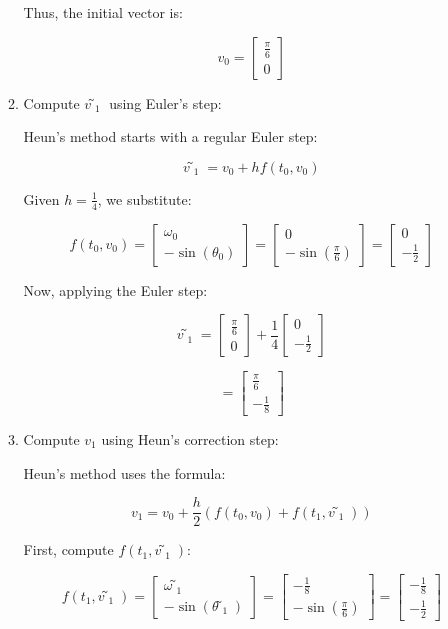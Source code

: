 \documentclass[12pt]{article}
\begin{document}
\begin{enumerate}
\begin{enumerate}
    Thus, the initial vector is:

    \[
    v_0 =
    \begin{bmatrix}
    \frac{\pi}{6} \\
    0
    \end{bmatrix}
    \]

    \item Compute \( ṽ_1 \) using Euler's step:

    Heun’s method starts with a regular Euler step:

    \[
    ṽ_1 = v_0 + h f(t_0, v_0)
    \]

    Given \( h = \frac{1}{4} \), we substitute:

    \[
    f(t_0, v_0) =
    \begin{bmatrix}
    \omega_0 \\
    -\sin(\theta_0)
    \end{bmatrix}
    =
    \begin{bmatrix}
    0 \\
    -\sin\left(\frac{\pi}{6}\right)
    \end{bmatrix}
    =
    \begin{bmatrix}
    0 \\
    -\frac{1}{2}
    \end{bmatrix}
    \]

    Now, applying the Euler step:

    \[
    ṽ_1 = 
    \begin{bmatrix}
    \frac{\pi}{6} \\
    0
    \end{bmatrix}
    + \frac{1}{4}
    \begin{bmatrix}
    0 \\
    -\frac{1}{2}
    \end{bmatrix}
    \]

    \[
    =
    \begin{bmatrix}
    \frac{\pi}{6} \\
    -\frac{1}{8}
    \end{bmatrix}
    \]

    \item Compute \( v_1 \) using Heun’s correction step:

    Heun’s method uses the formula:

    \[
    v_1 = v_0 + \frac{h}{2} \left( f(t_0, v_0) + f(t_1, ṽ_1) \right)
    \]

    First, compute \( f(t_1, ṽ_1) \):

    \[
    f(t_1, ṽ_1) =
    \begin{bmatrix}
    \omegã_1 \\
    -\sin(\thetã_1)
    \end{bmatrix}
    =
    \begin{bmatrix}
    -\frac{1}{8} \\
    -\sin\left(\frac{\pi}{6}\right)
    \end{bmatrix}
    =
    \begin{bmatrix}
    -\frac{1}{8} \\
    -\frac{1}{2}
    \end{bmatrix}
    \]


\end{enumerate}
\end{enumerate}
\end{document}
